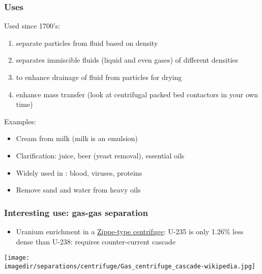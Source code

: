 \begin{frame}\frametitle{Uses}
	Used since 1700's:
	\begin{enumerate}
		\item	separate particles from fluid based on density
		\item	separates immiscible fluids (liquid and even gases) of different densities
		\item	to enhance drainage of fluid from particles for drying
		\item	enhance mass transfer {\scriptsize (look at centrifugal packed bed contactors in your own time)}
	\end{enumerate}

	\vspace{12pt}
	Examples:
	\begin{itemize}
		\item	Cream from milk (milk is an emulsion)
		\item	Clarification: juice, beer (yeast removal), essential oils
		\item	Widely used in {\color{myGreen}{bioseparations}}: blood, viruses, proteins
		\item	Remove sand and water from heavy oils
	\end{itemize}
\end{frame}

\begin{frame}\frametitle{Interesting use: gas-gas separation}
	\begin{itemize}
		\item	\small Uranium enrichment in a \href{http://en.wikipedia.org/wiki/Zippe-type_centrifuge}{Zippe-type centrifuge}:  U-235 is only 1.26\% less dense than U-238: requires counter-current cascade
	\end{itemize}
	\begin{center}
		\texttt{[image: \\imagedir/separations/centrifuge/Gas\_centrifuge\_cascade-wikipedia.jpg]}
	\end{center}
	\vspace{-12pt}
\end{frame}

